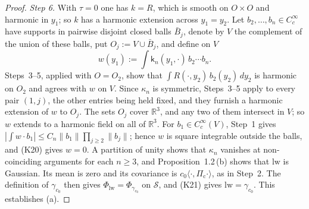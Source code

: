 \documentclass[11pt]{amsart}
\theoremstyle{definition}
\begin{document}
\begin{proof}
\emph{Step 6.}
With $\tau=0$ one has $k=R$, which is smooth on $O\times O$ and harmonic in $y_1$; so $k$ has a harmonic extension across $y_1=y_2$.
Let $b_2,\dots,b_n\in C_c^\infty$ have supports in pairwise disjoint closed balls $\bar B_j$, denote by $V$ the complement of the union of these balls, put $O_j:=V\cup\bar B_j$, and define on $V$
\begin{equation*}
w(y_1):=\int\mathsf k_n(y_1,\cdot)\,b_2\cdots b_n.
\end{equation*}
Steps~3--5, applied with $O=O_2$, show that $\int R(\cdot,y_2)\,b_2(y_2)\,dy_2$ is harmonic on $O_2$ and agrees with $w$ on $V$.
Since $\kappa_n$ is symmetric, Steps~3--5 apply to every pair $(1,j)$, the other entries being held fixed, and they furnish a harmonic extension of $w$ to $O_j$.
The sets $O_j$ cover $\mathbb R^3$, and any two of them intersect in $V$; so $w$ extends to a harmonic field on all of $\mathbb R^3$.
For $b_1\in C_c^\infty(V)$, Step~1 gives $|\int w\cdot b_1|\le C_n\|b_1\|\prod_{j\ge2}\|b_j\|$; hence $w$ is square integrable outside the balls, and (K20) gives $w=0$.
A partition of unity shows that $\kappa_n$ vanishes at non-coinciding arguments for each $n\ge3$, and Proposition~1.2\,(b) shows that $\mathrm{lw}$ is Gaussian.
Its mean is zero and its covariance is $c_0\langle\cdot,\Pi_{\mathrm c}\cdot\rangle$, as in Step~2.
The definition of $\gamma_{c_0}$ then gives $\Phi_{\mathrm{lw}}=\Phi_{\gamma_{c_0}}$ on $\mathcal S$, and (K21) gives $\mathrm{lw}=\gamma_{c_0}$.
This establishes (a).


\end{proof}
\end{document}
